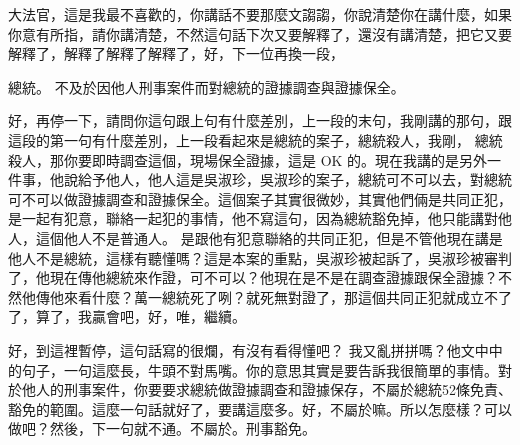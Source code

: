 \hypertarget{c11:cue:163}{}大法官，這是我最不喜歡的，你講話不要那麼文謅謅，你說清楚你在講什麼，如果你意有所指，請你講清楚，不然這句話下次又要解釋了，還沒有講清楚，把它又要解釋了，解釋了解釋了解釋了，好，下一位再換一段，\par{}總統。
\hypertarget{c11:cue:164}{}不及於因他人刑事案件而對總統的證據調查與證據保全。\par{}好，再停一下，請問你這句跟上句有什麼差別，上一段的末句，我剛講的那句，跟這段的第一句有什麼差別，上一段看起來是總統的案子，總統殺人，我剛，
\hypertarget{c11:cue:165}{}總統殺人，那你要即時調查這個，現場保全證據，這是 OK 的。現在我講的是另外一件事，他說給予他人，他人這是吳淑珍，吳淑珍的案子，總統可不可以去，對總統可不可以做證據調查和證據保全。這個案子其實很微妙，其實他們倆是共同正犯，是一起有犯意，聯絡一起犯的事情，他不寫這句，因為總統豁免掉，他只能講對他人，這個他人不是普通人。
\hypertarget{c11:cue:166}{}是跟他有犯意聯絡的共同正犯，但是不管他現在講是他人不是總統，這樣有聽懂嗎？這是本案的重點，吳淑珍被起訴了，吳淑珍被審判了，他現在傳他總統來作證，可不可以？他現在是不是在調查證據跟保全證據？不然他傳他來看什麼？萬一總統死了咧？就死無對證了，那這個共同正犯就成立不了了，算了，我贏會吧，好，唯，繼續。

\hypertarget{c11:cue:167}{}好，到這裡暫停，這句話寫的很爛，有沒有看得懂吧？
\hypertarget{c11:cue:168}{}我又亂拼拼嗎？他文中中的句子，一句這麼長，牛頭不對馬嘴。你的意思其實是要告訴我很簡單的事情。對於他人的刑事案件，你要要求總統做證據調查和證據保存，不屬於總統52條免責、豁免的範圍。這麼一句話就好了，要講這麼多。好，不屬於嘛。所以怎麼樣？可以做吧？然後，下一句就不通。不屬於。刑事豁免。


